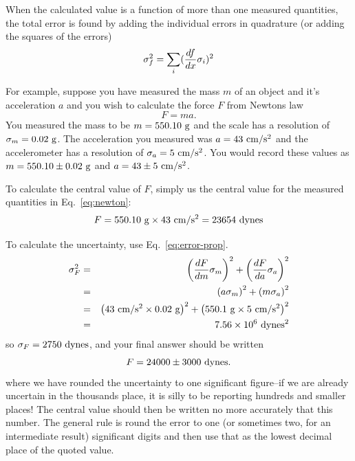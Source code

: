 When the calculated value is a function of more than one measured quantities, the total error is found by adding the individual errors in quadrature (or adding the squares of the errors)
\begin{equation}
\sigma_f^2 = \sum_i ({df \over dx} \sigma_i)^2
\label{eq:error-prop}
\end{equation}

For example, suppose you have measured the mass $m$ of an object and it's acceleration $a$ and you wish to calculate the force $F$ from Newtons law
\begin{equation}
F = ma.
\label{eq:newton}
\end{equation}
You measured the mass to be $m = 550.10~ {\rm g}$ and the scale has a resolution of $\sigma_m = 0.02 ~{\rm g}$.  The acceleration you measured was $a = 43 ~{\rm cm}/{\rm s}^2$ and the accelerometer has a resolution of $\sigma_a = 5 ~{\rm cm}/{\rm s}^2$.  You would record these values as $m = 550.10 \pm 0.02 ~{\rm g}$ and $a = 43 \pm 5 ~{\rm cm}/{\rm s}^2$.

To calculate the central value of $F$, simply us the central value for the measured quantities in Eq.~\ref{eq:newton}:
\begin{equation}
F = 550.10 ~{\rm g} \times 43~ {\rm cm}/{\rm s}^2 = 23654 ~{\rm dynes}
\end{equation}

To calculate the uncertainty, use Eq.~\ref{eq:error-prop}.
\begin{eqnarray*}
\sigma_F^2 &=& \left( {dF \over dm} \sigma_m \right)^2 + \left( {dF \over da} \sigma_a \right)^2 \\
&=& \left( a \sigma_m \right)^2 + \left( m \sigma_a \right)^2 \\
&=& \left( 43 ~{\rm cm}/{\rm s}^2\times  0.02 ~{\rm g} \right)^2 + \left( 550.1 ~{\rm g}\times  5~ {\rm cm}/{\rm s}^2\right)^2 \\
&=& 7.56\times 10^6 ~{\rm dynes^2}
\end{eqnarray*}
so $\sigma_F = 2750 ~{\rm dynes}$, and your final answer should be written
\begin{equation}
F = 24000 \pm 3000 ~{\rm dynes}.
\end{equation}
where we have rounded the uncertainty to one significant figure--if we are already uncertain in the thousands place, it is silly to be reporting hundreds and smaller places!  The central value should then be written no more accurately that this number.  The general rule is round the error to one (or sometimes two, for an intermediate result) significant digits and then use that as the lowest decimal place of the quoted value.  

